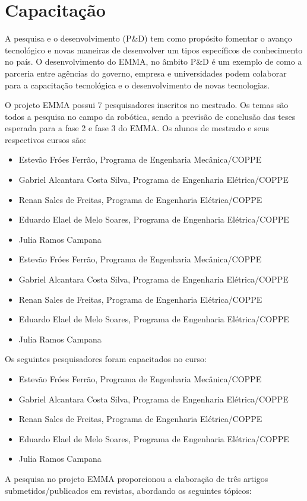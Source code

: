 \section{Capacitação}

A pesquisa e o desenvolvimento (P\&D) tem como propósito fomentar o avanço
tecnológico e novas maneiras de desenvolver um tipos específicos de conhecimento
no país. O desenvolvimento do EMMA, no âmbito P\&D é um exemplo de como a
parceria entre agências do governo, empresa e universidades podem colaborar para
a capacitação tecnológica e o desenvolvimento de novas tecnologias.

O projeto EMMA possui 7 pesquisadores inscritos no mestrado. Os temas são todos
a pesquisa no campo da robótica, sendo a previsão de conclusão das teses
esperada para a fase 2 e fase 3 do EMMA. Os alunos de mestrado e seus
respectivos cursos são:

\begin{itemize}
  \item Estevão Fróes Ferrão, Programa de Engenharia Mecânica/COPPE
  \item Gabriel Alcantara Costa Silva, Programa de Engenharia Elétrica/COPPE
  \item Renan Sales de Freitas, Programa de Engenharia Elétrica/COPPE
  \item Eduardo Elael de Melo Soares, Programa de Engenharia Elétrica/COPPE
  \item Julia Ramos Campana %
\end{itemize}

\begin{itemize}
  \item Estevão Fróes Ferrão, Programa de Engenharia Mecânica/COPPE
  \item Gabriel Alcantara Costa Silva, Programa de Engenharia Elétrica/COPPE
  \item Renan Sales de Freitas, Programa de Engenharia Elétrica/COPPE
  \item Eduardo Elael de Melo Soares, Programa de Engenharia Elétrica/COPPE
  \item Julia Ramos Campana %
\end{itemize}

Os seguintes pesquisadores foram capacitados no curso:

\begin{itemize}
  \item Estevão Fróes Ferrão, Programa de Engenharia Mecânica/COPPE
  \item Gabriel Alcantara Costa Silva, Programa de Engenharia Elétrica/COPPE
  \item Renan Sales de Freitas, Programa de Engenharia Elétrica/COPPE
  \item Eduardo Elael de Melo Soares, Programa de Engenharia Elétrica/COPPE
  \item Julia Ramos Campana %
\end{itemize}
A pesquisa no projeto EMMA proporcionou a elaboração de três artigos
submetidos/publicados em revistas, abordando os seguintes tópicos: 

